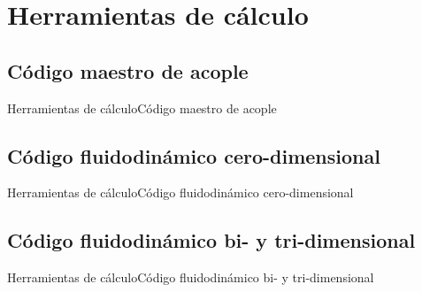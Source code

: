 \section{Herramientas de cálculo}

\subsection{Código maestro de acople}

\begin{frame}{Herramientas de cálculo}{Código maestro de acople}

\end{frame}


\subsection{Código fluidodinámico cero-dimensional}

\begin{frame}{Herramientas de cálculo}{Código fluidodinámico cero-dimensional}

\end{frame}


\subsection{Código fluidodinámico bi- y tri-dimensional}

\begin{frame}{Herramientas de cálculo}{Código fluidodinámico bi- y tri-dimensional}

\end{frame}



